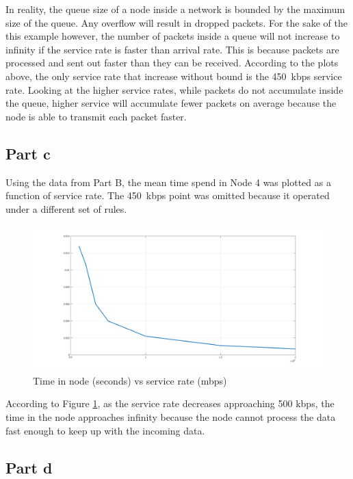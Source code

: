 \documentclass[12pt,letterpaper]{article}
\begin{document}
In reality, the queue size of a node inside a network is bounded by the maximum size
of the queue. Any overflow will result in dropped packets. For the sake of the this
example however, the number of packets inside a queue will not increase to infinity
if the service rate is faster than arrival rate. This is because packets are processed
and sent out faster than they can be received. According to the plots above, the only
service rate that increase without bound is the \SI{450}{kbps} service rate. Looking at
the higher service rates, while packets do not accumulate inside the queue, higher service
will accumulate fewer packets on average because the node is able to transmit each packet
faster.

\pagebreak

\subsection*{Part c}

Using the data from Part B, the mean time spend in Node 4 was plotted as a function
of service rate. The \SI{450}{kbps} point was omitted because it operated under a
different set of rules.

\begin{figure}[h!]
  \centering
  \includegraphics[width = 5in]{mean_time}
  \caption{Time in node (seconds) vs service rate (mbps)}
  \label{fig:pc}
\end{figure}

According to Figure \ref{fig:pc}, as the service rate decreases approaching 
500 kbps, the time in the node approaches infinity because the node cannot
process the data fast enough to keep up with the incoming data.

\pagebreak

\subsection*{Part d}
\end{document}
